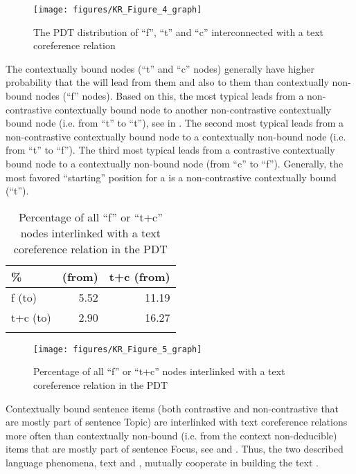 \documentclass[output=paper]{langsci/langscibook.cls}
\begin{document}
\begin{figure}
\texttt{[image: figures/KR\_Figure\_4\_graph]}
\caption{The PDT distribution of ``f'', ``t'' and ``c'' interconnected with a text coreference relation}
\label{rysova_k:fig:4}
\end{figure}


\newpage 
The contextually bound nodes (``t'' and ``c'' nodes) generally have higher probability that the  will lead from them and also to them than contextually non-bound nodes (``f'' nodes). Based on this, the most typical  leads from a non-contrastive contextually bound node to another non-contrastive contextually bound node (i.e. from ``t'' to ``t''), see  in . The second most typical  leads from a non-contrastive contextually bound node to a contextually non-bound node (i.e. from ``t'' to ``f''). The third most typical  leads from a contrastive contextually bound node to a contextually non-bound node (from ``c'' to ``f''). Generally, the most favored ``starting'' position for a  is a non-contrastive contextually bound  (``t'').



\begin{table}
\caption{Percentage of all ``f'' or ``t+c'' nodes interlinked with a text coreference relation in the PDT}
\begin{tabularx}{.8\textwidth}{Xrr}
\lsptoprule
\% &
(from) &
t+c (from)\\
\midrule
f (to) &
5.52 &
11.19\\
t+c (to) &
2.90 &
16.27\\
\lspbottomrule
\end{tabularx}
\label{rysova_k:tab:3}
\end{table}

\begin{figure} 
\texttt{[image: figures/KR\_Figure\_5\_graph]}
\caption{Percentage of all ``f'' or ``t+c'' nodes interlinked with a text coreference relation in the PDT}
\label{rysova_k:fig:5}
\end{figure}


Contextually bound sentence items (both contrastive and non-contrastive that are mostly part of sentence Topic) are interlinked with text coreference relations more often than contextually non-bound (i.e. from the context non-deducible) items that are mostly part of sentence Focus, see  and . Thus, the two described language phenomena, text  and , mutually cooperate in building the text .
\end{document}
